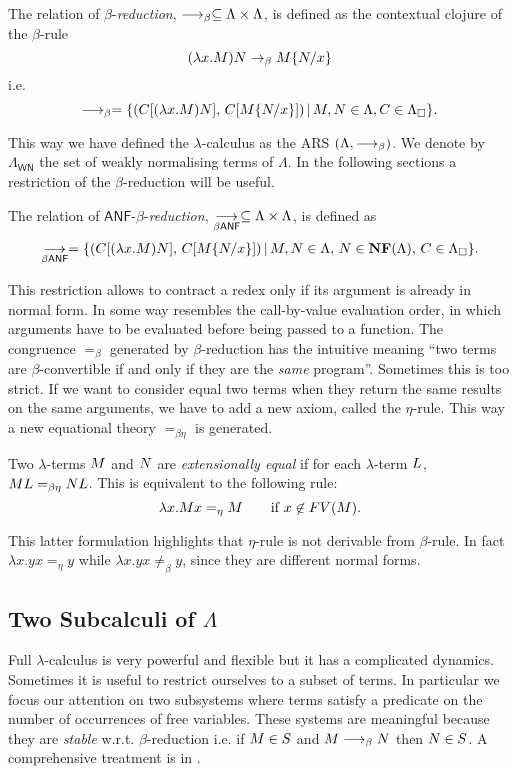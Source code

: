 \begin{definition}
	The relation of $\beta$-\emph{reduction}, $\longrightarrow_\beta\subseteq\Lambda\times\Lambda$, is defined as the contextual clojure of the $\beta$-rule
	$$
	(\lambda x.M)N\rightarrow_\beta M\{N/x\}
	$$
	i.e.
	$$
	\longrightarrow_\beta = \{(C[(\lambda x.M)N],\, C[M\{N/x\}])\, |\, M, N\in\Lambda, C\in\Lambda_\Box\}.
	$$
\end{definition}
This way we have defined the $\lambda$-calculus as the ARS $(\Lambda,\longrightarrow_\beta)$. We denote by $\Lambda_\mathsf{WN}$ the set of weakly normalising terms of $\Lambda$. In the following sections a restriction of the $\beta$-reduction will be useful.
\begin{definition}
	The relation of $\mathsf{ANF}$-$\beta$-\emph{reduction}, $\underset{\beta\textsf{ANF}}{\longrightarrow}\subseteq\Lambda\times\Lambda$, is defined as
	$$
	\underset{\beta\textsf{ANF}}{\longrightarrow} = \{(C[(\lambda x.M)N],\, C[M\{N/x\}])\, |\, M, N\in\Lambda,\,N\in\textbf{NF}(\Lambda),\, C\in\Lambda_\Box\}.
	$$
\end{definition}
This restriction allows to contract a redex only if its argument is already in normal form. In some way resembles the call-by-value evaluation order, in which arguments have to be evaluated before being passed to a function.
The congruence $=_\beta$ generated by $\beta$-reduction has the intuitive meaning ``two terms are $\beta$-convertible if and only if they are the \emph{same} program''. Sometimes this is too strict. If we want to consider equal two terms when they return the same results on the same arguments, we have to add a new axiom, called the $\eta$-rule. This way a new equational theory $=_{\beta\eta}$ is generated.
\begin{definition}
	Two $\lambda$-terms $M$ and $N$ are \emph{extensionally equal} if for each $\lambda$-term $L$, $ML=_{\beta\eta}NL$. This is equivalent to the following rule:
	$$
	\lambda x.M x=_\eta M \qquad\textrm{if }x\not\in FV(M).
	$$
\end{definition}
This latter formulation highlights that $\eta$-rule is not derivable from $\beta$-rule. In fact $\lambda x.yx=_\eta y$ while $\lambda x.yx\not=_\beta y$, since they are different normal forms.
\subsection{Two Subcalculi of $\Lambda$}
Full $\lambda$-calculus is very powerful and flexible but it has a complicated dynamics. Sometimes it is useful to restrict ourselves to a subset of terms. In particular we focus our attention on two subsystems where terms satisfy a predicate on the number of occurrences of free variables. These systems are meaningful because they are \emph{stable} w.r.t. $\beta$-reduction i.e. if $M\in S$ and $M\longrightarrow_\beta N$ then $N\in S$. A comprehensive treatment is in \cite{sinot_sub-lambda-calculi_2008}.
